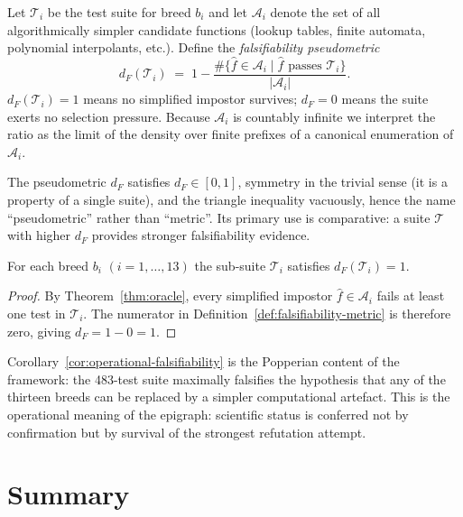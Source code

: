 \begin{definition}
\label{def:falsifiability-metric}
Let $\mathcal{T}_i$ be the test suite for breed $b_i$ and let
$\mathcal{A}_i$ denote the set of all algorithmically simpler candidate
functions (lookup tables, finite automata, polynomial interpolants, etc.).
Define the \emph{falsifiability pseudometric}
\[
  d_F(\mathcal{T}_i)
  \;=\;
  1 - \frac{\#\bigl\{\hat{f} \in \mathcal{A}_i \mid \hat{f} \text{ passes }
    \mathcal{T}_i\bigr\}}%
  {|\mathcal{A}_i|}.
\]
$d_F(\mathcal{T}_i) = 1$ means no simplified impostor survives; $d_F =
0$ means the suite exerts no selection pressure.  Because $\mathcal{A}_i$
is countably infinite we interpret the ratio as the limit of the density
over finite prefixes of a canonical enumeration of $\mathcal{A}_i$.
\end{definition}

The pseudometric $d_F$ satisfies $d_F \in [0,1]$, symmetry in the
trivial sense (it is a property of a single suite), and the triangle
inequality vacuously, hence the name ``pseudometric'' rather than
``metric''.  Its primary use is comparative: a suite $\mathcal{T}$ with
higher $d_F$ provides stronger falsifiability evidence.

\begin{corollary}
\label{cor:operational-falsifiability}
For each breed $b_i$ $(i = 1, \ldots, 13)$ the sub-suite $\mathcal{T}_i$
satisfies $d_F(\mathcal{T}_i) = 1$.
\end{corollary}

\begin{proof}
By Theorem~\ref{thm:oracle}, every simplified impostor $\hat{f} \in
\mathcal{A}_i$ fails at least one test in $\mathcal{T}_i$.  The numerator
in Definition~\ref{def:falsifiability-metric} is therefore zero, giving
$d_F = 1 - 0 = 1$.
\end{proof}

Corollary~\ref{cor:operational-falsifiability} is the Popperian content of
the framework: the 483-test suite maximally falsifies the hypothesis that
any of the thirteen breeds can be replaced by a simpler computational
artefact.  This is the operational meaning of the epigraph: scientific
status is conferred not by confirmation but by survival of the strongest
refutation attempt.

\section{Summary}
\label{sec:oracle-summary}

